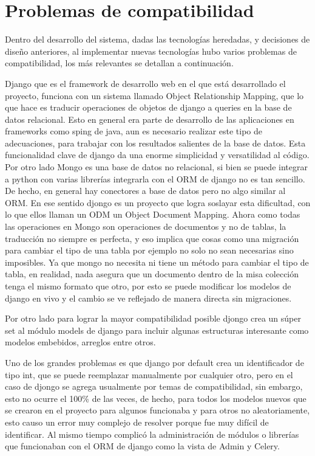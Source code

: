 \section{Problemas de compatibilidad}
    \par Dentro del desarrollo del sistema, dadas las tecnologías heredadas, y decisiones de diseño anteriores, al implementar nuevas tecnologías hubo varios problemas de compatibilidad, los más relevantes se detallan a continuación.
    \par Django que es el framework de desarrollo web en el que está desarrollado el proyecto, funciona con un sistema llamado Object Relationship Mapping, que lo que hace es traducir operaciones de objetos de django a queries en la base de datos relacional. Esto en general era parte de desarrollo de las aplicaciones en frameworks como sping de java, aun es necesario realizar este tipo de adecuaciones, para trabajar con los resultados salientes de la base de datos. Esta funcionalidad clave de django da una enorme simplicidad y versatilidad al código. Por otro lado Mongo es una base de datos no relacional, si bien se puede integrar a python con varias librerías integrarla con el ORM de django no es tan sencillo. De hecho, en general hay conectores a base de datos pero no algo similar al ORM. En ese sentido djongo es un proyecto que logra soslayar esta dificultad, con lo que ellos llaman un ODM un Object Document Mapping. Ahora como todas las operaciones en Mongo son operaciones de documentos y no de tablas, la traducción no siempre es perfecta, y eso implica que cosas como una migración para cambiar el tipo de una tabla por ejemplo no solo no sean necesarias sino imposibles. Ya que mongo no necesita ni tiene un método para cambiar el tipo de tabla, en realidad, nada asegura que un documento dentro de la misa colección tenga el mismo formato que otro, por esto se puede modificar los modelos de django en vivo y el cambio se ve reflejado de manera directa sin migraciones.
    \par Por otro lado para lograr la mayor compatibilidad posible djongo crea un súper set al módulo models de django para incluir algunas estructuras interesante como modelos embebidos, arreglos entre otros.
    \par Uno de los grandes problemas es que django por default crea un identificador de tipo int, que se puede reemplazar manualmente por cualquier otro, pero en el caso de djongo se agrega usualmente por temas de compatibilidad, sin embargo, esto no ocurre el 100\% de las veces, de hecho, para todos los modelos nuevos que se crearon en el proyecto para algunos funcionaba y para otros no aleatoriamente, esto causo un error muy complejo de resolver porque fue muy difícil de identificar. Al mismo tiempo complicó la administración de módulos o librerías que funcionaban con el ORM de django como la vista de Admin y Celery.
